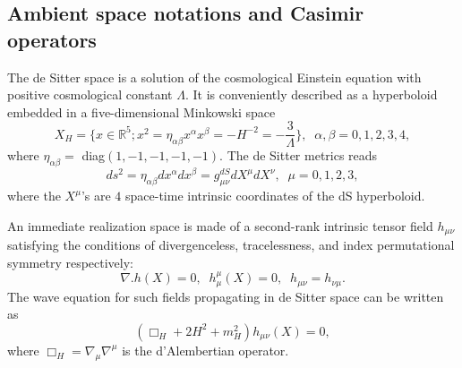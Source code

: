 \documentclass[a4paper,11pt,showpacs,preprintnumbers]{revtex4}
\def\setR{\mathbb{R}}
\begin{document}
\subsection{Ambient space notations and Casimir operators}
The de Sitter space is a solution of the cosmological Einstein
equation with positive cosmological constant $\Lambda$. It is
conveniently described as a hyperboloid embedded in a
five-dimensional Minkowski space
\begin{equation}
X_H=\{x \in \setR^5 ;x^2=\eta_{\alpha\beta} x^\alpha x^\beta
=-H^{-2}=-\frac{3}{\Lambda}\},\;\;\alpha,\beta=0,1,2,3,4,
\end{equation}
where $\eta_{\alpha\beta}=$ diag$(1,-1,-1,-1,-1)$. The de Sitter
metrics reads
$$ds^2=\eta_{\alpha\beta}dx^{\alpha}dx^{\beta}=g_{\mu\nu}^{dS}dX^{\mu}dX^{\nu},\;\;\mu=0,1,2,3,$$
where the $X^\mu$'s are  $4$ space-time intrinsic coordinates of
the dS hyperboloid.

An immediate  realization space is made of a second-rank intrinsic
tensor field $h_{\mu\nu}$ satisfying the conditions of
divergenceless, tracelessness, and index permutational symmetry
respectively:
\begin{equation}
\nabla.h(X)=0,\;\;h_{\mu}^{\mu}(X)=0,\;\;h_{\mu\nu}=h_{\nu\mu}.
\label{eq:con1}
\end{equation}
The wave equation for such fields propagating in de Sitter space
can be written as \cite{gasp}
\begin{equation}\label{eq:wav}
\left(\Box_H +2H^2+m_H^2\right) h_{\mu\nu}(X)=0,
\end{equation}
where $\Box_H=\nabla_{\mu}\nabla^{\mu}$ is the d'Alembertian
operator.
\end{document}

